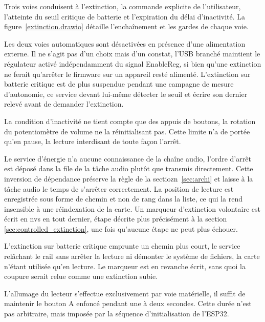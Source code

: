 Trois voies conduisent à l'extinction, la commande explicite de l'utilisateur, l'atteinte du seuil critique de batterie et l'expiration du délai d'inactivité. La figure~\ref{extinction.drawio} détaille l'enchaînement et les gardes de chaque voie.


Les deux voies automatiques sont désactivées en présence d'une alimentation externe. Il ne s'agit pas d'un choix mais d'un constat, l'USB branché maintient le régulateur activé indépendamment du signal EnableReg, si bien qu'une extinction ne ferait qu'arrêter le firmware sur un appareil resté alimenté. L'extinction sur batterie critique est de plus suspendue pendant une campagne de mesure d'autonomie, ce service devant lui-même détecter le seuil et écrire son dernier relevé avant de demander l'extinction.

La condition d'inactivité ne tient compte que des appuis de boutons, la rotation du potentiomètre de volume ne la réinitialisant pas. Cette limite n'a de portée qu'en pause, la lecture interdisant de toute façon l'arrêt.

Le service d'énergie n'a aucune connaissance de la chaîne audio, l'ordre d'arrêt est déposé dans la file de la tâche audio plutôt que transmis directement. Cette inversion de dépendance préserve la règle de la sectiozn~\ref{sec:archi} et laisse à la tâche audio le temps de s'arrêter correctement. La position de lecture est enregistrée sous forme de chemin et non de rang dans la liste, ce qui la rend insensible à une réindexation de la carte. Un marqueur d'extinction volontaire est écrit en \gls{nvs} en tout dernier, étape décrite plus précisément à la section \ref{sec:controlled_extinction}, une fois qu'aucune étape ne peut plus échouer.

L'extinction sur batterie critique emprunte un chemin plus court, le service relâchant le rail sans arrêter la lecture ni démonter le système de fichiers, la carte n'étant utilisée qu'en lecture. Le marqueur est en revanche écrit, sans quoi la coupure serait relue comme une extinction subie.

L’allumage du lecteur s’effectue exclusivement par voie matérielle, il suffit de maintenir le bouton A enfoncé pendant une à deux secondes. Cette durée n’est pas arbitraire, mais imposée par la séquence d’initialisation de l’ESP32.
